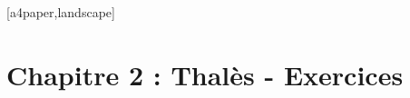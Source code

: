 

\newpage
{}[a4paper,landscape]%

\section*{Chapitre 2 : Thalès - Exercices}






















